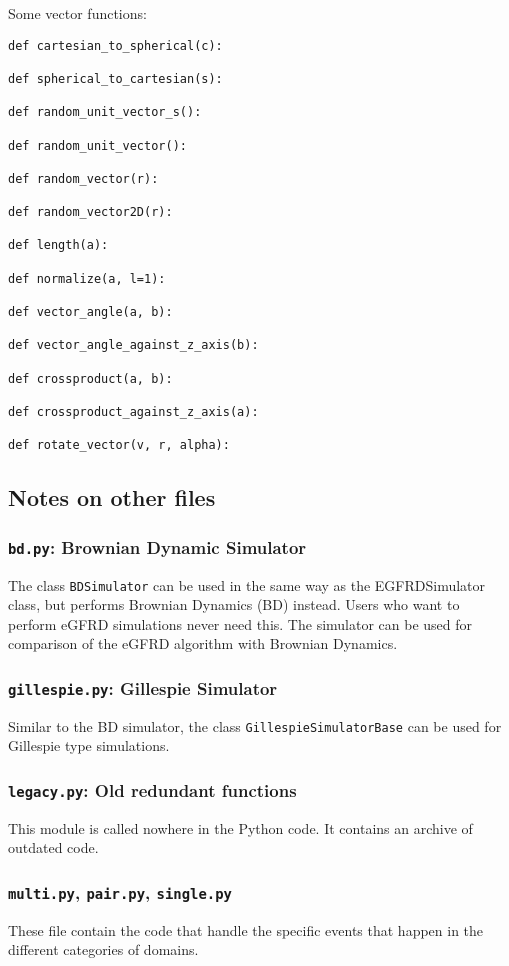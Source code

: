 \documentclass[a4paper,10pt]{article}
\begin{document}
Some vector functions:
\begin{verbatim}
def cartesian_to_spherical(c):

def spherical_to_cartesian(s):

def random_unit_vector_s():

def random_unit_vector():

def random_vector(r):

def random_vector2D(r):

def length(a):

def normalize(a, l=1):

def vector_angle(a, b):

def vector_angle_against_z_axis(b):

def crossproduct(a, b):

def crossproduct_against_z_axis(a):

def rotate_vector(v, r, alpha):
\end{verbatim}

\subsection{Notes on other files}

\subsubsection{\texttt{bd.py}: Brownian Dynamic Simulator}
The class \texttt{BDSimulator} can be used in the same way as the EGFRDSimulator class, but performs Brownian Dynamics (BD) instead. Users who want to perform eGFRD simulations never need this. The simulator can be used for comparison of the eGFRD algorithm with Brownian Dynamics. 

\subsubsection{\texttt{gillespie.py}: Gillespie Simulator}
Similar to the BD simulator, the class \texttt{GillespieSimulatorBase} can be used for Gillespie type simulations. 

\subsubsection{\texttt{legacy.py}: Old redundant functions}
This module is called nowhere in the Python code. It contains an archive of outdated code.

\subsubsection{\texttt{multi.py}, \texttt{pair.py}, \texttt{single.py}}
These file contain the code that handle the specific events that happen in the different categories of domains.
\end{document}
